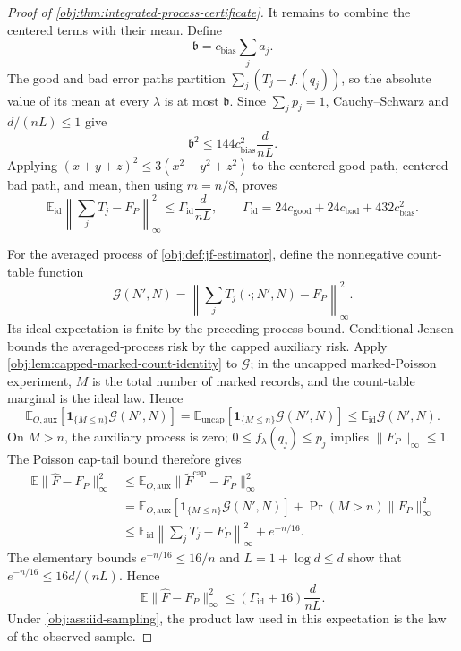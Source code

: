 \begin{proof}[Proof of \cref{obj:thm:integrated-process-certificate}]
It remains to combine the centered terms with their mean. Define
\[
\mathfrak b=c_{\mathrm{bias}}\sum_j a_j.
\]
The good and bad error paths partition \(\sum_j(T_j-f_\cdot(q_j))\), so the absolute value of its mean at every \(\lambda\) is at most \(\mathfrak b\). Since \(\sum_jp_j=1\), Cauchy–Schwarz and \(d/(nL)\leq1\) give
\[
\mathfrak b^2
 \leq144c_{\mathrm{bias}}^2\frac d{nL}.
\]
Applying \((x+y+z)^2\leq3(x^2+y^2+z^2)\) to the centered good path, centered bad path, and mean, then using \(m=n/8\), proves
\[
\mathbb E_{\mathrm{id}}
 \left\|\sum_jT_j-F_P\right\|_\infty^2
 \leq\Gamma_{\mathrm{id}}\frac d{nL},
\qquad
\Gamma_{\mathrm{id}}
 =24c_{\mathrm{good}}+24c_{\mathrm{bad}}
   +432c_{\mathrm{bias}}^2.
\]

For the averaged process of \cref{obj:def:jf-estimator}, define the nonnegative count-table function
\[
\mathcal G(N',N)
 =\left\|\sum_jT_j(\cdot;N',N)-F_P\right\|_\infty^2.
\]
Its ideal expectation is finite by the preceding process bound. Conditional Jensen bounds the averaged-process risk by the capped auxiliary risk. Apply \cref{obj:lem:capped-marked-count-identity} to \(\mathcal G\); in the uncapped marked-Poisson experiment, \(M\) is the total number of marked records, and the count-table marginal is the ideal law. Hence
\[
\mathbb E_{O,\mathrm{aux}}[\mathbf1_{\{M\leq n\}}\mathcal G(N',N)]
 =\mathbb E_{\mathrm{uncap}}[\mathbf1_{\{M\leq n\}}\mathcal G(N',N)]
 \leq\mathbb E_{\mathrm{id}}\mathcal G(N',N).
\]
On \(M>n\), the auxiliary process is zero; \(0\leq f_\lambda(q_j)\leq p_j\) implies \(\|F_P\|_\infty\leq1\). The Poisson cap-tail bound therefore gives
\[
\begin{aligned}
\mathbb E\|\widehat F-F_P\|_\infty^2
&\leq\mathbb E_{O,\mathrm{aux}}\|\widetilde F^{\mathrm{cap}}-F_P\|_\infty^2\\
&=\mathbb E_{O,\mathrm{aux}}[\mathbf1_{\{M\leq n\}}\mathcal G(N',N)]
  +\Pr(M>n)\|F_P\|_\infty^2\\
&\leq\mathbb E_{\mathrm{id}}
       \left\|\sum_jT_j-F_P\right\|_\infty^2
       +e^{-n/16}.
\end{aligned}
\]
The elementary bounds \(e^{-n/16}\leq16/n\) and
\(L=1+\log d\leq d\) show that \(e^{-n/16}\leq16d/(nL)\). Hence
\[
\mathbb E\|\widehat F-F_P\|_\infty^2
 \leq(\Gamma_{\mathrm{id}}+16)\frac d{nL}.
\]
Under \cref{obj:ass:iid-sampling}, the product law used in this expectation is the law of the observed sample. %


\end{proof}
